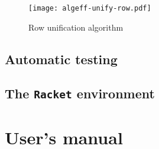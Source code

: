 \documentclass[inz, english, shortabstract]{iithesis}
\newcommand{\Racket}{\texttt{Racket}}
\begin{document}
\begin{figure}
  \centering
  \texttt{[image: algeff-unify-row.pdf]}
  \caption{Row unification algorithm}
  \label{fig:algeff-unify-row}
\end{figure}

\section{Automatic testing}

\section{The \Racket{} environment}

\chapter{User's manual}\label{ch:manual}

\printbibliography

\end{document}
